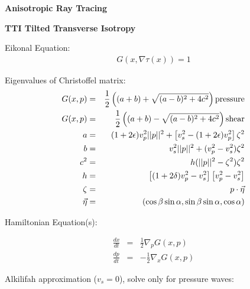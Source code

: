 \documentclass[12pt]{article}
\begin{document}
\textbf{Anisotropic Ray Tracing}




\textbf{TTI Tilted Transverse Isotropy}

Eikonal Equation:
\begin{eqnarray}
G(x,\nabla \tau(x)) = 1
\end{eqnarray}

Eigenvalues of Christoffel matrix:
\begin{eqnarray}
G(x,p) &=& \frac{1}{2} \left( (a+b) + \sqrt{(a-b)^2+4c^2} \right) \hbox{pressure} \\
G(x,p) &=& \frac{1}{2} \left( (a+b) - \sqrt{(a-b)^2+4c^2} \right) \hbox{shear} \\
a &=& (1+2\epsilon)v_p^2||p||^2+\left[v_s^2-(1+2\epsilon)v_p^2\right]\zeta^2 \\
b &=& v_s^2||p||^2+(v_p^2-v_s^2)\zeta^2 \\
c^2 &=& h(||p||^2-\zeta^2)\zeta^2 \\
h &=& \left[(1+2\delta)v_p^2-v_s^2\right]\left[v_p^2-v_s^2\right] \\
\zeta &=& p \cdot \vec{\eta} \\
\vec{\eta} &=& \left(\cos \beta \sin \alpha , \sin \beta \sin \alpha , \cos \alpha\right)
\end{eqnarray}

Hamiltonian Equation(s):

\begin{eqnarray}
\frac{dx}{dt} &=&  \frac{1}{2}\nabla_p G(x,p) \\
\frac{dp}{dt} &=& -\frac{1}{2}\nabla_x G(x,p)
\end{eqnarray}

Alkilifah approximation ($v_s = 0$), solve only for pressure waves:
\end{document}
